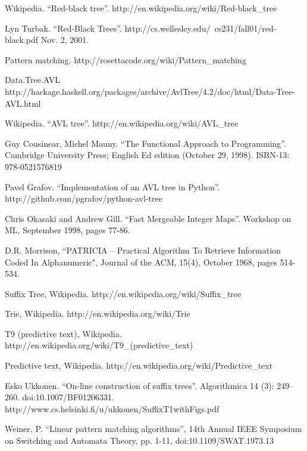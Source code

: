 \documentclass[UTF8]{article}
\begin{document}
\begin{thebibliography}{99}
Wikipedia. ``Red-black tree''. http://en.wikipedia.org/wiki/Red-black\_tree

Lyn Turbak. ``Red-Black Trees''. http://cs.wellesley.edu/~cs231/fall01/red-black.pdf Nov. 2, 2001.

Pattern matching. http://rosettacode.org/wiki/Pattern\_matching

Data.Tree.AVL http://hackage.haskell.org/packages/archive/AvlTree/4.2/doc/html/Data-Tree-AVL.html

Wikipedia. ``AVL tree''. http://en.wikipedia.org/wiki/AVL\_tree

Guy Cousinear, Michel Mauny. ``The Functional Approach to Programming''. Cambridge University Press; English Ed edition (October 29, 1998). ISBN-13: 978-0521576819

Pavel Grafov. ``Implementation of an AVL tree in Python''. http://github.com/pgrafov/python-avl-tree


Chris Okasaki and Andrew Gill. ``Fast Mergeable Integer Maps''. Workshop on ML, September 1998, pages 77-86.

D.R. Morrison, ``PATRICIA -- Practical Algorithm To Retrieve  Information Coded In Alphanumeric", Journal of the ACM, 15(4), October 1968, pages 514-534.

Suffix Tree, Wikipedia. http://en.wikipedia.org/wiki/Suffix\_tree

Trie, Wikipedia. http://en.wikipedia.org/wiki/Trie

T9 (predictive text), Wikipedia. http://en.wikipedia.org/wiki/T9\_(predictive\_text)

Predictive text, Wikipedia. http://en.wikipedia.org/wiki/Predictive\_text


Esko Ukkonen. ``On-line construction of suffix trees''. Algorithmica 14 (3): 249--260. doi:10.1007/BF01206331. http://www.cs.helsinki.fi/u/ukkonen/SuffixT1withFigs.pdf

Weiner, P. ``Linear pattern matching algorithms'', 14th Annual IEEE Symposium on Switching and Automata Theory, pp. 1-11, doi:10.1109/SWAT.1973.13


\end{thebibliography}
\end{document}
